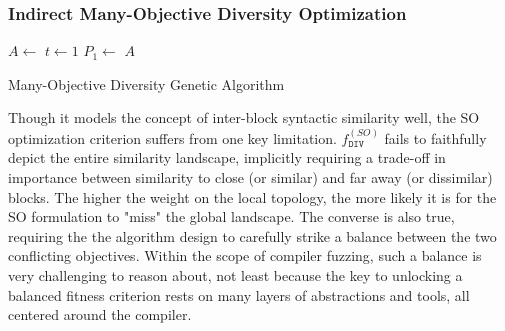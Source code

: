 \subsubsection{\label{subsec:moga}Indirect Many-Objective Diversity Optimization}

\begin{algorithm}[t]

	\BlankLine
	\DontPrintSemicolon
	$A \leftarrow$ \;
	$t \leftarrow 1$\;
	$P_1 \leftarrow $ \;
	\Return $A$\;
	\caption{Many-Objective Diversity Genetic Algorithm}
	\label{alg:modga}
\end{algorithm}

Though it models the concept of inter-block syntactic similarity well,
the \Gls{SO} optimization criterion suffers from one key limitation.
$f^{(SO)}_{\texttt{DIV}}$ fails to faithfully depict
the entire similarity landscape, implicitly requiring
a trade-off in importance between similarity
to close (or similar) and far away (or dissimilar) blocks.
The higher the weight on the local topology, the more likely it is for the \gls{SO} formulation to "miss" the global landscape.
The converse is also true, requiring the the algorithm design to carefully strike
a balance between the two conflicting objectives.
Within the scope of compiler fuzzing, such a balance is very challenging to reason about,
not least because the key to unlocking a balanced fitness criterion
rests on many layers of abstractions and tools,
all centered around the compiler.

